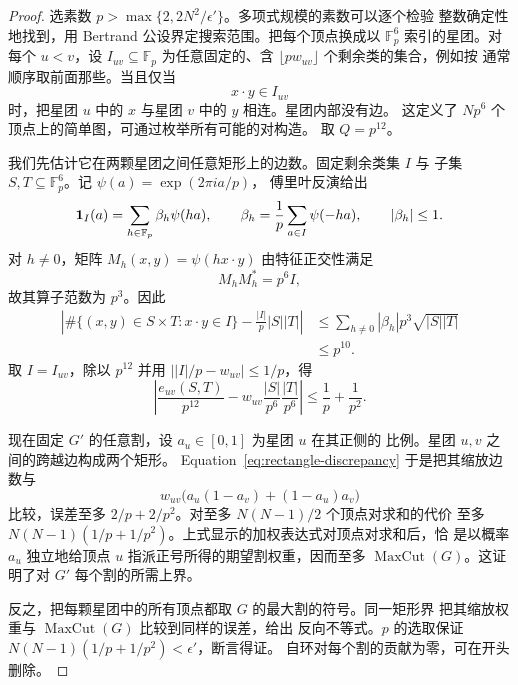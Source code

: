 \begin{proof}
选素数 $p>\max\{2,2N^2/\epsilon'\}$。多项式规模的素数可以逐个检验
整数确定性地找到，用 Bertrand 公设界定搜索范围。把每个顶点换成以
$\mathbb F_p^6$ 索引的星团。对每个 $u<v$，设 $I_{uv}\subseteq\mathbb F_p$
为任意固定的、含 $\lfloor p w_{uv}\rfloor$ 个剩余类的集合，例如按
通常顺序取前面那些。当且仅当
\[
 x\cdot y\in I_{uv}
\]
时，把星团 $u$ 中的 $x$ 与星团 $v$ 中的 $y$ 相连。星团内部没有边。
这定义了 $Np^6$ 个顶点上的简单图，可通过枚举所有可能的对构造。
取 $Q=p^{12}$。

我们先估计它在两颗星团之间任意矩形上的边数。固定剩余类集 $I$ 与
子集 $S,T\subseteq\mathbb F_p^6$。记 $\psi(a)=\exp(2\pi i a/p)$，
傅里叶反演给出
\[
 \mathbf 1_I(a)=\sum_{h\in\mathbb F_p}\beta_h\psi(ha),\qquad
 \beta_h=\frac1p\sum_{a\in I}\psi(-ha),\qquad
 |\beta_h|\le1.
\]
对 $h\ne0$，矩阵 $M_h(x,y)=\psi(hx\cdot y)$ 由特征正交性满足
\[
 M_hM_h^*=p^6 I,
\]
故其算子范数为 $p^3$。因此
\begin{align*}
 \left|\#\{(x,y)\in S\times T:x\cdot y\in I\}
                -\frac{|I|}{p}|S||T|\right|
 &\le\sum_{h\ne0}|\beta_h|p^3\sqrt{|S||T|}\\
 &\le p^{10}.
\end{align*}
取 $I=I_{uv}$，除以 $p^{12}$ 并用
$\bigl||I|/p-w_{uv}\bigr|\le1/p$，得
\begin{equation}\label{eq:rectangle-discrepancy}
 \left|\frac{e_{uv}(S,T)}{p^{12}}
       -w_{uv}\frac{|S|}{p^6}\frac{|T|}{p^6}\right|
 \le\frac1p+\frac1{p^2}.
\end{equation}

现在固定 $G'$ 的任意割，设 $a_u\in[0,1]$ 为星团 $u$ 在其正侧的
比例。星团 $u,v$ 之间的跨越边构成两个矩形。
Equation~\eqref{eq:rectangle-discrepancy} 于是把其缩放边数与
\[
 w_{uv}\bigl(a_u(1-a_v)+(1-a_u)a_v\bigr)
\]
比较，误差至多 $2/p+2/p^2$。对至多 $N(N-1)/2$ 个顶点对求和的代价
至多 $N(N-1)(1/p+1/p^2)$。上式显示的加权表达式对顶点对求和后，恰
是以概率 $a_u$ 独立地给顶点 $u$ 指派正号所得的期望割权重，因而至多
$\operatorname{MaxCut}(G)$。这证明了对 $G'$ 每个割的所需上界。

反之，把每颗星团中的所有顶点都取 $G$ 的最大割的符号。同一矩形界
把其缩放权重与 $\operatorname{MaxCut}(G)$ 比较到同样的误差，给出
反向不等式。$p$ 的选取保证
$N(N-1)(1/p+1/p^2)<\epsilon'$，断言得证。
自环对每个割的贡献为零，可在开头删除。
\end{proof}
